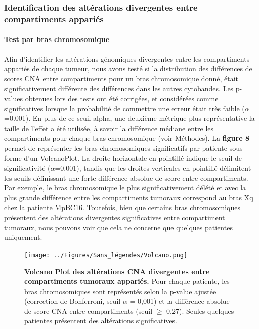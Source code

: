 \documentclass[11pt]{article}
\begin{document}
\subsubsection{Identification des altérations divergentes entre compartiments appariés}

\paragraph{Test par bras chromosomique}

Afin d’identifier les altérations génomiques divergentes entre les compartiments appariés de chaque tumeur, nous avons testé si la distribution des différences de scores CNA entre compartiments pour un bras chromosomique donné, était significativement différente des différences dans les autres cytobandes. Les p-values obtenues lors des tests ont été corrigées, et considérées comme significatives lorsque la probabilité de commettre une erreur était très faible ($\alpha$=0.001). En plus de ce seuil alpha, une deuxième métrique plus représentative la taille de l’effet a été utilisée, à savoir la différence médiane entre les compartiments pour chaque bras chromosomique (voir Méthodes). La \textbf{figure 8} permet de représenter les bras chromosomiques significatifs par patiente sous forme d’un VolcanoPlot. La droite horizontale en pointillé indique le seuil de significativité ($\alpha$=0.001), tandis que les droites verticales en pointillé délimitent les seuils définissant une forte différence absolue de score entre compartiments. Par exemple, le bras chromosomique le plus significativement délété et avec la plus grande différence entre les compartiments tumoraux correspond au bras Xq chez la patiente MpBC16. Toutefois, bien que certains bras chromosomiques présentent des altérations divergentes significatives entre compartiment tumoraux, nous pouvons voir que cela ne concerne que quelques patientes uniquement.

\begin{figure}[H]
    \centering
    \texttt{[image: ../Figures/Sans\_légendes/Volcano.png]}
    \caption[\textbf{Figure 8 : Volcano Plot des altérations CNA divergentes entre compartiments tumoraux appariés.}]{\footnotesize \textbf{Volcano Plot des altérations CNA divergentes entre compartiments tumoraux appariés.} Pour chaque patiente, les bras chromosomiques sont représentés selon la p-value ajustée (correction de Bonferroni, seuil $\alpha$ = 0,001) et la différence absolue de score CNA entre compartiments (seuil $\ge$ 0,27). Seules quelques patientes présentent des altérations significatives.}
    \label{fig:fig8}
\end{figure}
\end{document}
